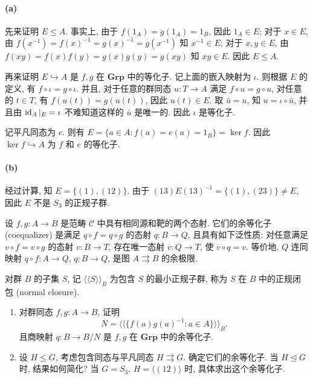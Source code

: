 \documentclass{article}
\begin{document}
\begin{solution}
	\paragraph{(a)} 先来证明 $E \le A$. 事实上, 由于 $f(1_A) = g(1_A) = 1_B$, 因此 $1_A \in E$; 对于 $x \in E$, 由 $f(x^{-1}) = f(x)^{-1} = g(x)^{-1} = g(x^{-1}	)$ 知 $x^{-1} \in E$; 对于 $x, y \in E$, 由 $f(xy) = f(x)f(y) = g(x)g(y) = g(xy)$ 知 $xy \in E$. 因此 $E \le A$. 

	再来证明 $E \hookrightarrow A$ 是 $f,g$ 在 $\mathbf{Grp}$ 中的等化子. 记上面的嵌入映射为 $\iota$. 则根据 $E$ 的定义, 有 $f \circ \iota = g \circ \iota$. 并且, 对于任意的群同态 $u: T \to A$ 满足 $f \circ u = g \circ u$, 对任意的 $t \in T$, 有 $f(u(t)) = g(u(t))$, 因此 $u(t) \in E$. 取 $\bar{u} = u$, 知 $u = \iota \circ \bar{u}$, 并且由 $\operatorname{id}_A|_{E} = \iota$ 不难知道这样的 $\bar{u}$ 是唯一的. 因此 $\iota$ 是等化子.

	记平凡同态为 $e$. 则有 $E = \{a \in A: f(a) = e(a) = 1_{B}\} = \ker f$. 因此 $\ker f \hookrightarrow A$ 为 $f$ 和 $e$ 的等化子. 

	\paragraph{(b)} 经过计算, 知 $E = \{(1), (12)\}$. 由于 $(13)E(13)^{-1} = \{(1), (23)\} \neq E$, 因此 $E$ 不是 $S_3$ 的正规子群.
\end{solution}



\begin{problem}
设 $f,g:A\to B$ 是范畴 $\mathcal C$ 中具有相同源和靶的两个态射. 它们的余等化子 (coequalizer) 是满足 $q\circ f=q\circ g$ 的态射 $q:B\to Q$, 且具有如下泛性质: 对任意满足 $v\circ f=v\circ g$ 的态射 $v:B\to T$, 存在唯一态射 $\overline v:Q\to T$, 使 $\overline v\circ q=v$. 等价地, $Q$ 连同映射 $q\circ f:A\to Q$, $q:B\to Q$, 是图 $A\rightrightarrows B$ 的余极限.

对群 $B$ 的子集 $S$, 记 $\langle\!\langle S\rangle\!\rangle_B$ 为包含 $S$ 的最小正规子群, 称为 $S$ 在 $B$ 中的正规闭包 (normal closure).
\begin{enumerate}
  \item[(a)] 对群同态 $f,g:A\to B$, 证明
  \[
    N=\big\langle\!\big\langle\{f(a)g(a)^{-1}:a\in A\}\big\rangle\!\big\rangle_B.
  \]
  且商映射 $q:B\to B/N$ 是 $f,g$ 在 $\mathbf{Grp}$ 中的余等化子.
  \item[(b)] 设 $H\le G$, 考虑包含同态与平凡同态 $H\rightrightarrows G$. 确定它们的余等化子. 当 $H\unlhd G$ 时, 结果如何简化? 当 $G=S_3$, $H=\langle(12)\rangle$ 时, 具体求出这个余等化子.
\end{enumerate}
\end{problem}
\end{document}
